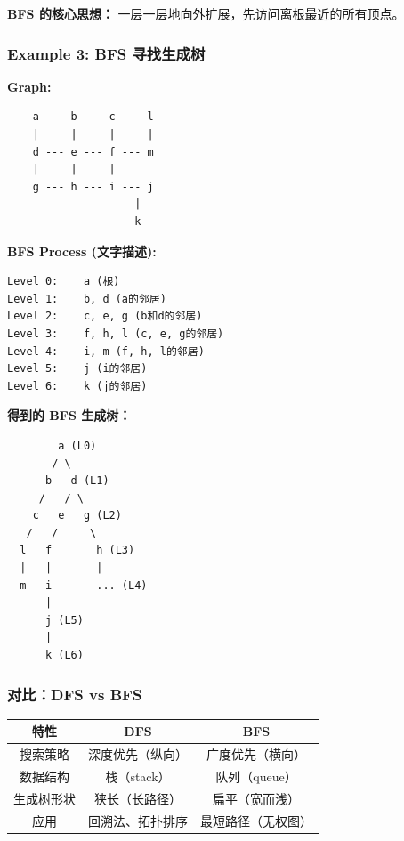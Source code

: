 \documentclass[10pt,a4paper,openany]{ctexbook}
\theoremstyle{definition}
\theoremstyle{remark}
\renewenvironment{quote}
  {\list{}{\leftmargin=1em\rightmargin=0pt\topsep=0.5pt\partopsep=0pt}\item[]}
  {\endlist}
\begin{document}
\begin{quote}
\textbf{BFS 的核心思想：} 一层一层地向外扩展，先访问离根最近的所有顶点。

\end{quote}

\subsubsection{Example 3: BFS 寻找生成树}

\textbf{Graph:}
{\footnotesize\begin{verbatim}
    a --- b --- c --- l
    |     |     |     |
    d --- e --- f --- m
    |     |     |
    g --- h --- i --- j
                    |
                    k
\end{verbatim}}

\textbf{BFS Process (文字描述):}
{\footnotesize\begin{verbatim}
Level 0:    a (根)
Level 1:    b, d (a的邻居)
Level 2:    c, e, g (b和d的邻居)
Level 3:    f, h, l (c, e, g的邻居)
Level 4:    i, m (f, h, l的邻居)
Level 5:    j (i的邻居)
Level 6:    k (j的邻居)
\end{verbatim}}

\textbf{得到的 BFS 生成树：}
{\footnotesize\begin{verbatim}
        a (L0)
       / \
      b   d (L1)
     /   / \
    c   e   g (L2)
   /   /     \
  l   f       h (L3)
  |   |       |
  m   i       ... (L4)
      |
      j (L5)
      |
      k (L6)
\end{verbatim}}

\vspace{-2pt}

\subsubsection{对比：DFS vs BFS}

\begin{center}
\begin{tabular}{ccc}
\hline
特性 & DFS & BFS \\ \hline
搜索策略 & 深度优先（纵向） & 广度优先（横向） \\
数据结构 & 栈（stack） & 队列（queue） \\
生成树形状 & 狭长（长路径） & 扁平（宽而浅） \\
应用 & 回溯法、拓扑排序 & 最短路径（无权图） \\
\hline
\end{tabular}

\end{center}
\end{document}
